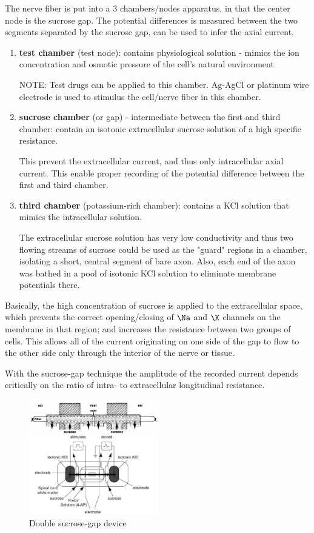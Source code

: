 The nerve fiber is put into a 3 chambers/nodes apparatus, in that the center
node is the sucrose gap. The potential differences is measured between the two
segments separated by the sucrose gap, can be used to infer the axial current.

\begin{enumerate}

  \item {\bf test chamber} (test node): contains physiological solution - mimics
  the ion concentration and osmotic pressure of the cell's natural environment

NOTE: Test drugs can be applied to this chamber. Ag-AgCl or platinum wire
electrode is used to stimulus the cell/nerve fiber in this chamber.

  \item {\bf sucrose chamber} (or gap) - intermediate between the first and
  third chamber: contain an isotonic extracellular sucrose solution of a high
  specific resistance.

This prevent the extracellular current, and thus only intracellular axial
current. This enable proper recording of the potential difference between the
first and third chamber.

  \item {\bf third chamber} (potassium-rich chamber): contains a KCl solution
  that mimics the intracellular solution.

The extracellular sucrose solution has very low conductivity and thus two
flowing streams of sucrose could be used as the "guard" regions in a chamber,
isolating a short, central segment of bare axon. Also, each end of the axon was
bathed in a pool of isotonic KCl solution to eliminate membrane potentials
there.
\end{enumerate}
Basically, the high concentration of sucrose is applied to the extracellular
space, which prevents the correct opening/closing of $\Na$ and $\K$ channels on
the membrane in that region; and increases the resistance between two groups of
cells. This allows all of the current originating on one side of the gap to flow to the
other side only through the interior of the nerve or tissue.

With the sucrose-gap technique the amplitude of the recorded current depends
critically on the ratio of intra- to extracellular longitudinal resistance.


\begin{figure}[hbt]
 \centerline{\includegraphics[height=5cm]{./images/double-sucrose-gap.eps}}
 \caption{Double sucrose-gap device}
\label{fig:double-sucrose-gap}
\end{figure}


